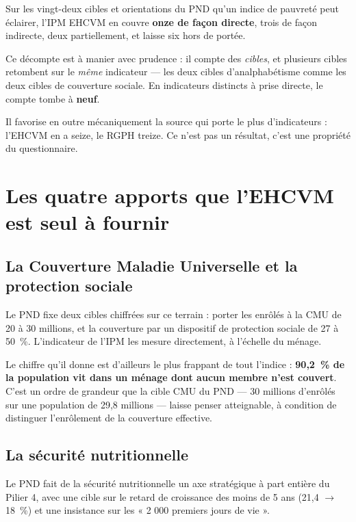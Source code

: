 \documentclass[11pt,a4paper]{article}
\begin{document}
\begin{retenir}
Sur les vingt-deux cibles et orientations du PND qu'un indice de pauvreté peut éclairer, l'IPM
EHCVM en couvre \textbf{onze de façon directe}, trois de façon indirecte, deux partiellement, et
laisse six hors de portée.

Ce décompte est à manier avec prudence : il compte des \emph{cibles}, et plusieurs cibles
retombent sur le \emph{même} indicateur --- les deux cibles d'analphabétisme comme les deux cibles
de couverture sociale. En indicateurs distincts à prise directe, le compte tombe à \textbf{neuf}.

Il favorise en outre mécaniquement la source qui porte le plus d'indicateurs : l'EHCVM en a seize,
le RGPH treize. Ce n'est pas un résultat, c'est une propriété du questionnaire.
\end{retenir}

\section{Les quatre apports que l'EHCVM est seul à fournir}

\subsection{La Couverture Maladie Universelle et la protection sociale}

Le PND fixe deux cibles chiffrées sur ce terrain : porter les enrôlés à la CMU de 20 à 30 millions,
et la couverture par un dispositif de protection sociale de 27 à 50~\%. L'indicateur
 de l'IPM les mesure directement, à l'échelle du ménage.

Le chiffre qu'il donne est d'ailleurs le plus frappant de tout l'indice : \textbf{90,2~\% de la
population vit dans un ménage dont aucun membre n'est couvert}. C'est un ordre de grandeur que la
cible CMU du PND --- 30 millions d'enrôlés sur une population de 29,8 millions --- laisse penser
atteignable, à condition de distinguer l'enrôlement de la couverture effective.

\subsection{La sécurité nutritionnelle}

Le PND fait de la sécurité nutritionnelle un axe stratégique à part entière du Pilier 4, avec une
cible sur le retard de croissance des moins de 5 ans (21,4 $\to$ 18~\%) et une insistance sur les
« 2 000 premiers jours de vie ».
\end{document}

